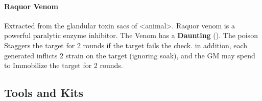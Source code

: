 \begin{multicols}{2}
\paragraph{Raquor Venom} \label{poison:raquor}
Extracted from the glandular toxin sacs of <animal>. Raquor venom is a powerful
paralytic enzyme inhibitor. The Venom has a \textbf{Daunting} (\difficulty\difficulty\difficulty\difficulty).
The poison Staggers the target for 2 rounds if the target fails the check. in
addition, each \threat generated inflicts 2 strain on the target (ignoring soak),
and the GM may spend \despair to Immobilize the target for 2 rounds.

%
%
%

\end{multicols}
\hrulefill

\subsection{Tools and Kits}

